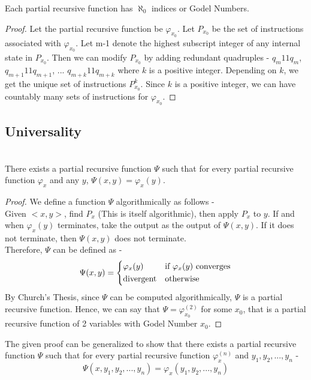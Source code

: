 \documentclass[openany]{book}
\begin{document}
\begin{mytheorem}
    Each partial recursive function has $\aleph_0$ indices or Godel Numbers. 
\end{mytheorem}
\begin{proof}
    Let the partial recursive function be $\varphi_{x_0}$. Let $P_{x_0}$ be the set of instructions associated with $\varphi_{x_0}$. Let m-1 denote the highest subscript integer of any internal state in $P_{x_0}$. Then we can modify $P_{x_0}$ by adding redundant quadruples - $q_{m}11q_m$, $q_{m+1}11q_{m+1}$, ... $q_{m+k}11q_{m+k}$ where $k$ is a positive integer. Depending on $k$, we get the unique set of instructions $P^{k}_{x_0}$. Since $k$ is a positive integer, we can have countably many sets of instructions for $\varphi_{x_0}$.
\end{proof}
\subsection{Universality}
\begin{mytheorem}
     \\
    There exists a partial recursive function $\Psi$ such that for every partial recursive function $\varphi_x$ and any $y$, $\Psi(x, y) = \varphi_x(y)$.
\end{mytheorem}
\begin{proof}
We define a function $\Psi$ algorithmically as follows - \\
Given $<x, y>$, find $P_x$ (This is itself algorithmic), then apply $P_x$ to $y$. If and when $\varphi_x(y)$ terminates, take the output as the output of $\Psi(x, y)$. If it does not terminate, then $\Psi(x, y)$ does not terminate. \\
Therefore, $\Psi$ can be defined as - 
$$\Psi(x, y) = 
\begin{dcases}
    \varphi_x(y) & \text{if } \varphi_x(y) \text{ converges} \\
    \text{divergent} & \text{otherwise}
\end{dcases}$$
By Church's Thesis, since $\Psi$ can be computed algorithmically, $\Psi$ is a partial recursive function. Hence, we can say that $\Psi = \varphi^{(2)}_{x_0}$ for some $x_0$, that is a partial recursive function of 2 variables with Godel Number $x_0$.
\end{proof}
The given proof can be generalized to show that there exists a partial recursive function $\Psi$ such that for every partial recursive function $\varphi^{(n)}_x$ and $y_1, y_2, ..., y_n$ - $$\Psi(x, y_1, y_2, ..., y_n) = \varphi_x(y_1, y_2, ..., y_n)$$ 
\end{document}
